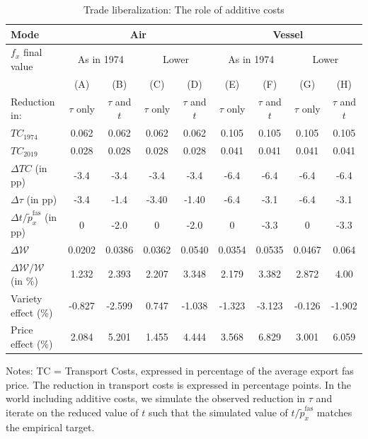 \documentclass[a4paper,11pt]{article}
\begin{document}
\begin{table}[htbp]
  \centering
  \caption{Trade liberalization: The role of additive costs} \label{tab:resultats_modele}
\begin{center}
\begin{tabular}{l||c|c|c|c||c|c|c|c}
\hline
Mode & \multicolumn{4}{|c||}{Air} & \multicolumn{4}{c}{Vessel} \\ \hline
$f_x$ final value &  \multicolumn{2}{|c|}{As in 1974} &  \multicolumn{2}{|c||}{Lower} & \multicolumn{2}{|c|}{As in 1974} & \multicolumn{2}{|c}{Lower } \\ \hline
& (A) & (B) & (C) & (D) & (E) & (F) &(G) & (H) \\
Reduction in: & $\tau$ only & $\tau$ and $t$ &$\tau$ only & $\tau$ and $t$ & $\tau$ only & $\tau$ and $t$ &$\tau$ only & $\tau$ and $t$\\  \hline
$TC_{1974}$ & 0.062 & 0.062 & 0.062 & 0.062 & 0.105 & 0.105 & 0.105 & 0.105\\
$TC_{2019}$ &  0.028 & 0.028 & 0.028 & 0.028&  0.041 & 0.041 & 0.041 & 0.041\\
$\Delta TC$ (in pp) &-3.4 &-3.4 &-3.4 &-3.4 &-6.4 &-6.4 &-6.4 &-6.4  \\
$\Delta \tau$ (in pp) & -3.4	&-1.4&	-3.40&	-1.40	&-6.4&	-3.1&	-6.4&	-3.1  \\
$\Delta t/\widetilde{p}_x^{\text{fas}}$ (in pp) & 0&	-2.0&	0&	-2.0&	0&	-3.3& 0&	-3.3 \\ \hline
$\Delta \mathcal{W}$ & 0.0202 &  0.0386 & 0.0362 & 0.0540 & 0.0354 & 0.0535 & 0.0467 & 	0.064 \\
$\Delta \mathcal{W}/\mathcal{W}$ (in \%) & 1.232&	2.393 &	2.207	&3.348	&2.179	&3.382 &	2.872&	4.00   \\\hline
Variety effect (\%)&	-0.827 	&-2.599	&0.747
&-1.038	&-1.323	& -3.123&	-0.126	&-1.902 \\
Price effect (\%)&	2.084 &5.201	& 1.455 &	4.444&	3.568	& 6.829&	 3.001&	6.059 \\
\hline
\end{tabular}
\end{center}
{\parbox[l]{15cm}{ \vspace{4pt}\footnotesize{Notes: TC = Transport Costs, expressed in percentage of the average export fas price. The reduction in transport costs is expressed in percentage points. In the world including additive costs, we simulate the observed reduction in $\tau$ and iterate on the reduced value of $t$ such that the simulated value of $t/\widetilde{p}_x^{\text{fas}}$ matches the empirical target.  }}}
\end{table}
\end{document}
